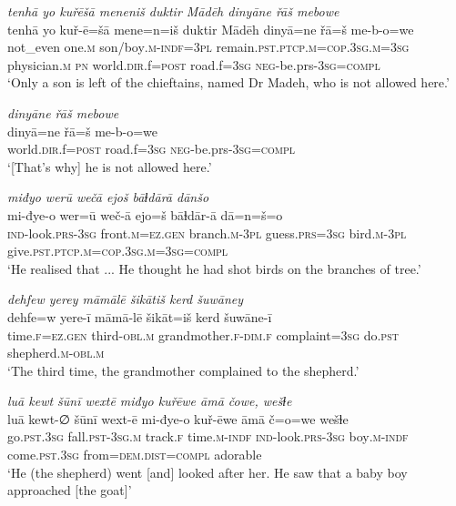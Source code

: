 \ea \label{ŠJ.105}
\textit{tenhā yo kuřēšā meneniš duktir Mādēh dinyāne řāš mebowe} \\ 
\gll tenhā yo kuř-ē=šā mene=n=iš duktir Mādēh dinyā=ne řā=š me-b-o=we \\ 
 not\_even one\textsc{.m} son/boy\textsc{.m}\textsc{-indf}\textsc{=3pl} remain\textsc{.pst}\textsc{.ptcp}\textsc{.m}\textsc{=cop}\textsc{.3sg}\textsc{.m}\textsc{=3sg} physician\textsc{.m} \textsc{pn} world\textsc{.dir}.f\textsc{=\textsc{post}} road.f\textsc{=3sg} \textsc{neg-}be.prs\textsc{-3sg}\textsc{=compl} \\ 
\glt `Only a son is left of the chieftains, named Dr Madeh, who is not allowed here.'
\z 
 
\ea \label{ŠJ.108}
\textit{dinyāne řāš mebowe} \\ 
\gll dinyā=ne řā=š me-b-o=we \\ 
 world\textsc{.dir}.f\textsc{=\textsc{post}} road.f\textsc{=3sg} \textsc{neg-}be.prs\textsc{-3sg}\textsc{=compl} \\ 
\glt `[That’s why] he is not allowed here.'
\z 
 
\ea \label{KŠ.5}
\textit{miđyo werū wečā ejoš bāɫdārā dānšo} \\ 
\gll mi-đye-o wer=ū weč-ā ejo=š bāɫdār-ā dā=n=š=o \\ 
 \textsc{ind-}look\textsc{.prs}\textsc{-3sg} front\textsc{.m}\textsc{=ez.gen} branch\textsc{.m}\textsc{-3pl} guess\textsc{.prs}\textsc{=3sg} bird\textsc{.m}\textsc{-3pl} give\textsc{.pst}\textsc{.ptcp}\textsc{.m}\textsc{=cop}\textsc{.3sg}\textsc{.m}\textsc{=3sg}\textsc{=compl} \\ 
\glt `He realised that ... He thought he had shot birds on the branches of tree.'
\z 
 
\ea \label{KŠ.27}
\textit{dehfew yerey māmālē šikātiš kerd šuwāney} \\ 
\gll dehfe=w yere-ī māmā-lē šikāt=iš kerd šuwāne-ī \\ 
 time\textsc{.f}\textsc{=ez.gen} third\textsc{-obl}\textsc{.m} grandmother\textsc{.f}\textsc{-dim}\textsc{.f} complaint\textsc{=3sg} do\textsc{.pst} shepherd\textsc{.m}\textsc{-obl}\textsc{.m} \\ 
\glt `The third time, the grandmother complained to the shepherd.'
\z 
 
\ea \label{KŠ.30}
\textit{luā kewt šūnī wextē miđyo kuřēwe āmā čowe, wešɫe} \\ 
\gll luā kewt-∅ šūnī wext-ē mi-đye-o kuř-ēwe āmā č=o=we wešɫe \\ 
 go\textsc{.pst}\textsc{.3sg} fall\textsc{.pst}\textsc{-3sg}\textsc{.m} track\textsc{.f} time\textsc{.m}\textsc{-indf} \textsc{ind-}look\textsc{.prs}\textsc{-3sg} boy\textsc{.m}\textsc{-indf} come\textsc{.pst}\textsc{.3sg} from=\textsc{dem.dist}\textsc{=compl} adorable \\ 
\glt `He (the shepherd) went [and] looked after her. He saw that a baby boy approached [the goat]'
\z 
 
